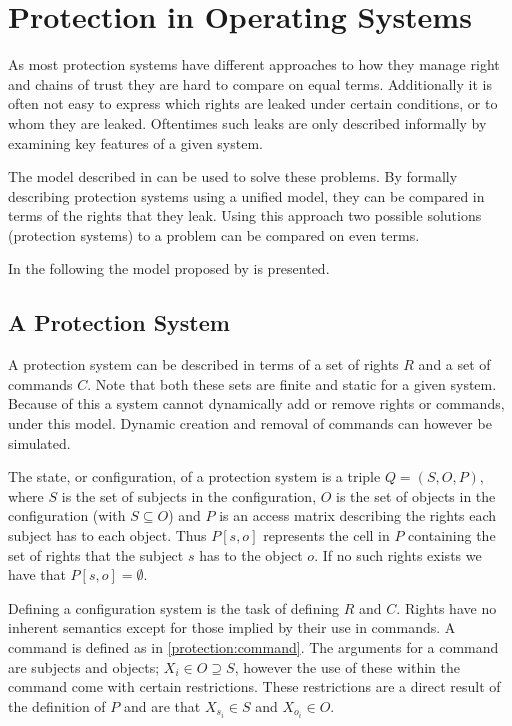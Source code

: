 \section{Protection in Operating Systems}
As most protection systems have different approaches to how they manage right and chains of trust they are hard to compare on equal terms.
Additionally it is often not easy to express which rights are leaked under certain conditions, or to whom they are leaked.
Oftentimes such leaks are only described informally by examining key features of a given system.

The model described in \cite{HRU} can be used to solve these problems.
By formally describing protection systems using a unified model, they can be compared in terms of the rights that they leak.
Using this approach two possible solutions (protection systems) to a problem can be compared on even terms.

In the following the model proposed by \cite{HRU} is presented.

\subsection{A Protection System}
A protection system can be described in terms of a set of rights $R$ and a set of commands $C$.
Note that both these sets are finite and static for a given system.
Because of this a system cannot dynamically add or remove rights or commands, under this model.
Dynamic creation and removal of commands can however be simulated.

The state, or configuration, of a protection system is a triple $Q = (S, O, P)$, where $S$ is the set of subjects in the configuration, $O$ is the set of objects in the configuration (with $S \subseteq O$) and $P$ is an access matrix describing the rights each subject has to each object.
Thus $P[s, o]$ represents the cell in $P$ containing the set of rights that the subject $s$ has to the object $o$.
If no such rights exists we have that $P[s,o] = \emptyset$.

Defining a configuration system is the task of defining $R$ and $C$.
Rights have no inherent semantics except for those implied by their use in commands.
A command is defined as in \cref{protection:command}.
The arguments for a command are subjects and objects; $X_i \in O \supseteq S$, however the use of these within the command come with certain restrictions.
These restrictions are a direct result of the definition of $P$ and are that $X_{s_i} \in S$ and $X_{o_i} \in O$.

